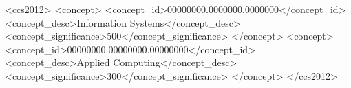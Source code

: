 \documentclass[sigconf]{acmart}
\begin{document}
\begin{CCSXML}
<ccs2012>
 <concept>
  <concept_id>00000000.0000000.0000000</concept_id>
  <concept_desc>Information Systems</concept_desc>
  <concept_significance>500</concept_significance>
 </concept>
 <concept>
  <concept_id>00000000.00000000.00000000</concept_id>
  <concept_desc>Applied Computing</concept_desc>
  <concept_significance>300</concept_significance>
 </concept>
</ccs2012>
\end{CCSXML}



\maketitle
\end{document}
